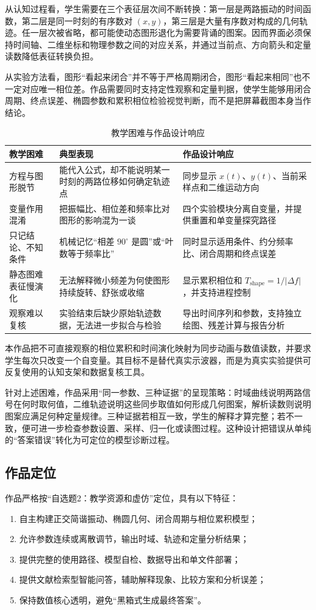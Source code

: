 \documentclass[UTF8,a4paper,zihao=-4]{ctexart}
\begin{document}
从认知过程看，学生需要在三个表征层次间不断转换：第一层是两路振动的时间函数，第二层是同一时刻的有序数对 $(x,y)$，第三层是大量有序数对构成的几何轨迹。任一层次被省略，都可能使动态图形退化为需要背诵的图案。因而界面必须保持时间轴、二维坐标和物理参数之间的对应关系，并通过当前点、方向箭头和定量读数降低表征转换负担。

从实验方法看，图形“看起来闭合”并不等于严格周期闭合，图形“看起来相同”也不一定对应唯一相位差。作品需要同时支持定性观察和定量判据，使学生能够用闭合周期、终点误差、椭圆参数和累积相位检验视觉判断，而不是把屏幕截图本身当作结论。

\begin{table}[!htb]
\centering
\caption{教学困难与作品设计响应}
\label{tab:liss-problems}
\begin{tabularx}{\textwidth}{p{3.2cm}X X}
\toprule
教学困难 & 典型表现 & 作品设计响应\\
\midrule
方程与图形脱节 & 能代入公式，却不能说明某一时刻的两路位移如何确定轨迹点 & 同步显示 $x(t)$、$y(t)$、当前采样点和二维运动方向\\
变量作用混淆 & 把振幅比、相位差和频率比对图形的影响混为一谈 & 四个实验模块分离自变量，并提供重置和单变量探究路径\\
只记结论、不知条件 & 机械记忆“相差 $90^\circ$ 是圆”或“叶数等于频率比” & 同时显示适用条件、约分频率比、闭合周期和终点误差\\
静态图难表征慢演化 & 无法解释微小频差为何使图形持续旋转、舒张或收缩 & 显示累积相位和 $T_{\mathrm{shape}}=1/|\Delta f|$，并支持进程控制\\
观察难以复核 & 实验结束后缺少原始轨迹数据，无法进一步拟合与检验 & 导出时间序列和参数，支持独立绘图、残差计算与报告分析\\
\bottomrule
\end{tabularx}
\end{table}

本作品把不可直接观察的相位累积和时间演化映射为同步动画与数值读数，并要求学生每次只改变一个自变量。其目标不是替代真实示波器，而是为真实实验提供可反复使用的认知支架和数据复核工具。

针对上述困难，作品采用“同一参数、三种证据”的呈现策略：时域曲线说明两路信号在何时取何值，二维轨迹说明这些同步取值如何形成几何图案，解析读数则说明图案应满足何种定量规律。三种证据若相互一致，学生的解释才算完整；若不一致，便可进一步检查参数设置、采样、归一化或读图过程。这种设计把错误从单纯的“答案错误”转化为可定位的模型诊断过程。

\subsection{作品定位}
作品严格按“自选题2：教学资源和虚仿”定位，具有以下特征：
\begin{enumerate}
  \item 自主构建正交简谐振动、椭圆几何、闭合周期与相位累积模型；
  \item 允许参数连续或离散调节，输出时域、轨迹和定量分析结果；
  \item 提供完整的使用路径、模型自检、数据导出和单文件部署；
  \item 提供文献检索型智能问答，辅助解释现象、比较方案和分析误差；
  \item 保持数值核心透明，避免“黑箱式生成最终答案”。
\end{enumerate}
\end{document}
